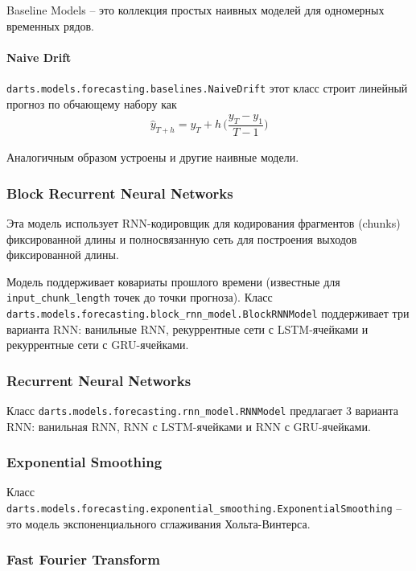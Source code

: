 \documentclass[%
	11pt,
	a4paper,
	utf8,
		]{article}
\begin{document}
Baseline Models -- это коллекция простых наивных моделей для одномерных временных рядов.

\paragraph{Naive Drift}

\verb|darts.models.forecasting.baselines.NaiveDrift| этот класс строит линейный прогноз по обчающему набору как
\begin{align*}
	\hat{y}_{T + h} = y_T + h \, \Big( \dfrac{y_T - y_1}{ T - 1} \Big)
\end{align*}

Аналогичным образом устроены и другие наивные модели.

\subsubsection{Block Recurrent Neural Networks}

Эта модель использует RNN-кодировщик для кодирования фрагментов (chunks) фиксированной длины и полносвязанную сеть для построения выходов фиксированной длины.

Модель поддерживает ковариаты прошлого времени (известные для \verb|input_chunk_length| точек до точки прогноза). Класс \verb|darts.models.forecasting.block_rnn_model.BlockRNNModel| поддерживает три варианта RNN: ванильные RNN, рекуррентные сети с LSTM-ячейками и рекуррентные сети с GRU-ячейками.

\subsubsection{Recurrent Neural Networks}

Класс \verb|darts.models.forecasting.rnn_model.RNNModel| предлагает 3 варианта RNN: ванильная RNN, RNN с LSTM-ячейками и RNN с GRU-ячейками.


\subsubsection{Exponential Smoothing}

Класс \verb|darts.models.forecasting.exponential_smoothing.ExponentialSmoothing| -- это модель экспоненциального сглаживания Хольта-Винтерса.

\subsubsection{Fast Fourier Transform}
\end{document}
